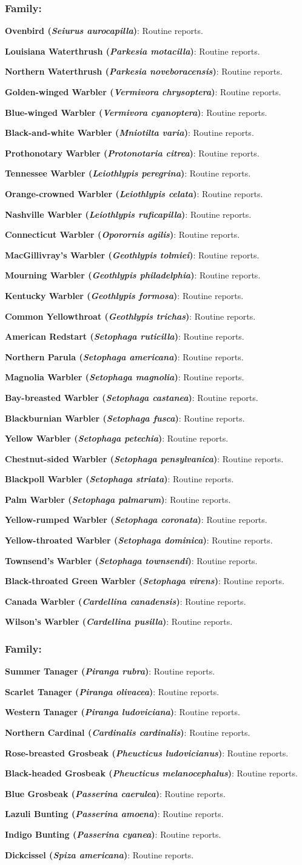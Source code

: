 \documentclass[OA]{fieldreport}
\newcommand{\rr}{Routine reports.}
\newcommand{\spp}[3]{\hangindent=0.7cm \textbf{#1 (\textit{#2})}: #3\par}
\newcommand{\family}[1]{\subsubsection*{Family: \text{#1}} \vskip0.2cm}
\begin{document}
	\family{Parulidae}

	\spp{Ovenbird}{Seiurus aurocapilla}{\rr}
	\spp{Louisiana Waterthrush}{Parkesia motacilla}{\rr}
	\spp{Northern Waterthrush}{Parkesia noveboracensis}{\rr}
	\spp{Golden-winged Warbler}{Vermivora chrysoptera}{\rr}
	\spp{Blue-winged Warbler}{Vermivora cyanoptera}{\rr}
	\spp{Black-and-white Warbler}{Mniotilta varia}{\rr}
	\spp{Prothonotary Warbler}{Protonotaria citrea}{\rr}
	\spp{Tennessee Warbler}{Leiothlypis peregrina}{\rr}
	\spp{Orange-crowned Warbler}{Leiothlypis celata}{\rr}
	\spp{Nashville Warbler}{Leiothlypis ruficapilla}{\rr}
	\spp{Connecticut Warbler}{Oporornis agilis}{\rr}
	\spp{MacGillivray's Warbler}{Geothlypis tolmiei}{\rr}
	\spp{Mourning Warbler}{Geothlypis philadelphia}{\rr}
	\spp{Kentucky Warbler}{Geothlypis formosa}{\rr}
	\spp{Common Yellowthroat}{Geothlypis trichas}{\rr}
	\spp{American Redstart}{Setophaga ruticilla}{\rr}
	\spp{Northern Parula}{Setophaga americana}{\rr}
	\spp{Magnolia Warbler}{Setophaga magnolia}{\rr}
	\spp{Bay-breasted Warbler}{Setophaga castanea}{\rr}
	\spp{Blackburnian Warbler}{Setophaga fusca}{\rr}
	\spp{Yellow Warbler}{Setophaga petechia}{\rr}
	\spp{Chestnut-sided Warbler}{Setophaga pensylvanica}{\rr}
	\spp{Blackpoll Warbler}{Setophaga striata}{\rr}
	\spp{Palm Warbler}{Setophaga palmarum}{\rr}
	\spp{Yellow-rumped Warbler}{Setophaga coronata}{\rr}
	\spp{Yellow-throated Warbler}{Setophaga dominica}{\rr}
	\spp{Townsend's Warbler}{Setophaga townsendi}{\rr}
	\spp{Black-throated Green Warbler}{Setophaga virens}{\rr}
	\spp{Canada Warbler}{Cardellina canadensis}{\rr}
	\spp{Wilson's Warbler}{Cardellina pusilla}{\rr}

	\family{Cardinalidae}

	\spp{Summer Tanager}{Piranga rubra}{\rr}
	\spp{Scarlet Tanager}{Piranga olivacea}{\rr}
	\spp{Western Tanager}{Piranga ludoviciana}{\rr}
	\spp{Northern Cardinal}{Cardinalis cardinalis}{\rr}
	\spp{Rose-breasted Grosbeak}{Pheucticus ludovicianus}{\rr}
	\spp{Black-headed Grosbeak}{Pheucticus melanocephalus}{\rr}
	\spp{Blue Grosbeak}{Passerina caerulea}{\rr}
	\spp{Lazuli Bunting}{Passerina amoena}{\rr}
	\spp{Indigo Bunting}{Passerina cyanea}{\rr}
	\spp{Dickcissel}{Spiza americana}{\rr}
\end{document}
